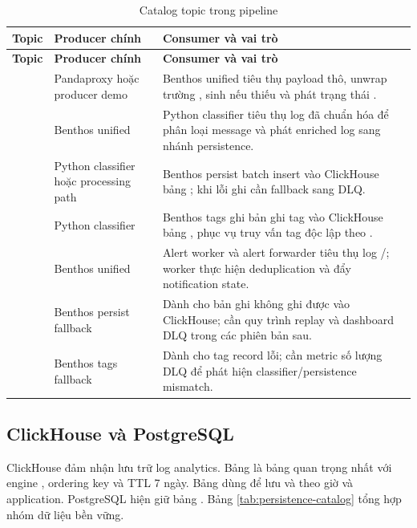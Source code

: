 \begin{longtable}{|P{3.3cm}|P{4.3cm}|P{5.9cm}|}
\caption{Catalog topic trong pipeline \LogRider{}}
\label{tab:topic-catalog}\\
\hline
\textbf{Topic} & \textbf{Producer chính} & \textbf{Consumer và vai trò} \\ \hline
\endfirsthead
\hline
\textbf{Topic} & \textbf{Producer chính} & \textbf{Consumer và vai trò} \\ \hline
\endhead
{} & Pandaproxy hoặc producer demo & Benthos unified tiêu thụ payload thô, unwrap trường , sinh  nếu thiếu và phát trạng thái . \\ \hline
{} & Benthos unified & Python classifier tiêu thụ log đã chuẩn hóa để phân loại message và phát enriched log sang nhánh persistence. \\ \hline
{} & Python classifier hoặc processing path & Benthos persist batch insert vào ClickHouse bảng ; khi lỗi ghi cần fallback sang DLQ. \\ \hline
{} & Python classifier & Benthos tags ghi bản ghi tag vào ClickHouse bảng , phục vụ truy vấn tag độc lập theo . \\ \hline
{} & Benthos unified & Alert worker và alert forwarder tiêu thụ log /; worker thực hiện deduplication và đẩy notification state. \\ \hline
{} & Benthos persist fallback & Dành cho bản ghi không ghi được vào ClickHouse; cần quy trình replay và dashboard DLQ trong các phiên bản sau. \\ \hline
{} & Benthos tags fallback & Dành cho tag record lỗi; cần metric số lượng DLQ để phát hiện classifier/persistence mismatch. \\ \hline
\end{longtable}

\subsection{ClickHouse và PostgreSQL}

ClickHouse đảm nhận lưu trữ log analytics. Bảng  là bảng quan trọng nhất với engine , ordering key  và TTL 7 ngày. Bảng  dùng  để lưu  và  theo giờ và application. PostgreSQL hiện giữ bảng . Bảng \ref{tab:persistence-catalog} tổng hợp nhóm dữ liệu bền vững.


